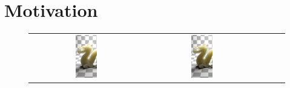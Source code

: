 \section{Motivation}
\label{sec:motivation}
\begin{figure}
\centering
\begin{tabular}{@{}c@{}c@{}c@{}c@{}c@{}}
\includegraphics[width=0.2\textwidth]{figures/thesis_pt}& 	 \includegraphics[width=0.2\textwidth]{figures/thesis_pt_unconverged} &

\end{tabular}
\end{figure}
